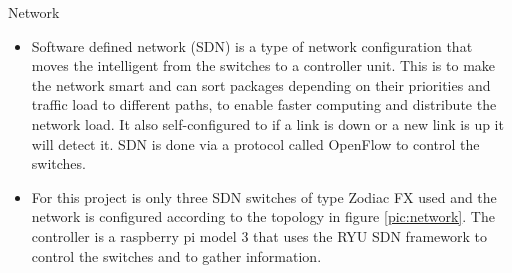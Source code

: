 \documentclass[final,hyperref={pdfpagelabels=false}]{beamer}
\begin{document}
\begin{frame}[t]
\begin{columns}[t]
\begin{column}{.465\textwidth}
%
%
%
%        
%
%
%    
%

\begin{block}{Network}
    \begin{itemize}
        \item Software defined network (SDN) is a type of network configuration that moves the intelligent from the switches to a controller unit. This is to make the network smart and can sort packages depending on their priorities and traffic load to different paths, to enable faster computing and distribute the network load. It also self-configured to if a link is down or a new link is up it will detect it.  SDN is done via a protocol called OpenFlow to control the switches. 
        
        \item For this project is only three SDN switches of type Zodiac FX used and the network is configured according to the topology in figure \ref{pic:network}. The controller is a raspberry pi model 3 that uses the RYU SDN framework to control the switches and to gather information. 
        

\end{itemize}
\end{block}
\end{column}
\end{columns}
\end{frame}
\end{document}

